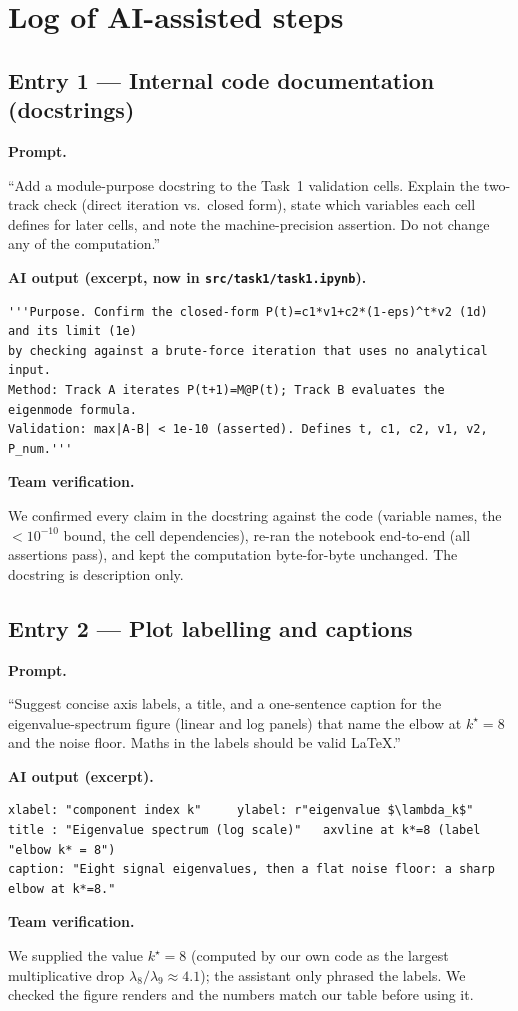 \documentclass[11pt,a4paper]{article}
\newcommand{\logentry}[1]{\subsection*{#1}}
\begin{document}
\section{Log of AI-assisted steps}

\logentry{Entry 1 --- Internal code documentation (docstrings)}
\textbf{Prompt.}
\begin{promptbox}
``Add a module-purpose docstring to the Task~1 validation cells. Explain the two-track check
(direct iteration vs.\ closed form), state which variables each cell defines for later cells,
and note the machine-precision assertion. Do not change any of the computation.''
\end{promptbox}
\textbf{AI output (excerpt, now in \texttt{src/task1/task1.ipynb}).}
\begin{outbox}
\begin{lstlisting}
'''Purpose. Confirm the closed-form P(t)=c1*v1+c2*(1-eps)^t*v2 (1d) and its limit (1e)
by checking against a brute-force iteration that uses no analytical input.
Method: Track A iterates P(t+1)=M@P(t); Track B evaluates the eigenmode formula.
Validation: max|A-B| < 1e-10 (asserted). Defines t, c1, c2, v1, v2, P_num.'''
\end{lstlisting}
\end{outbox}
\textbf{Team verification.}
\begin{verbox}
We confirmed every claim in the docstring against the code (variable names, the $<10^{-10}$
bound, the cell dependencies), re-ran the notebook end-to-end (all assertions pass), and kept the
computation byte-for-byte unchanged. The docstring is description only.
\end{verbox}

\logentry{Entry 2 --- Plot labelling and captions}
\textbf{Prompt.}
\begin{promptbox}
``Suggest concise axis labels, a title, and a one-sentence caption for the eigenvalue-spectrum
figure (linear and log panels) that name the elbow at $k^\star=8$ and the noise floor. Maths in
the labels should be valid \LaTeX.''
\end{promptbox}
\textbf{AI output (excerpt).}
\begin{outbox}
\begin{lstlisting}
xlabel: "component index k"     ylabel: r"eigenvalue $\lambda_k$"
title : "Eigenvalue spectrum (log scale)"   axvline at k*=8 (label "elbow k* = 8")
caption: "Eight signal eigenvalues, then a flat noise floor: a sharp elbow at k*=8."
\end{lstlisting}
\end{outbox}
\textbf{Team verification.}
\begin{verbox}
We supplied the value $k^\star=8$ (computed by our own code as the largest multiplicative drop
$\lambda_8/\lambda_9\approx4.1$); the assistant only phrased the labels. We checked the figure
renders and the numbers match our table before using it.
\end{verbox}
\end{document}

